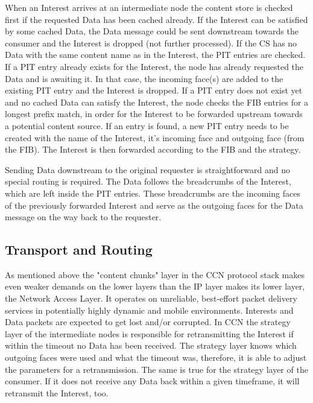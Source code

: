 When an Interest arrives at an intermediate node the content store is checked first if the requested Data has been cached already. If the Interest can be satisfied by some cached Data, the Data message could be sent downstream towards the consumer and the Interest is dropped (not further processed). If the CS has no Data with the same content name as in the Interest, the PIT entries are checked. If a PIT entry already exists for the Interest, the node has already requested the Data and is awaiting it. In that case, the incoming face(s) are added to the existing PIT entry and the Interest is dropped. If a PIT entry does not exist yet and no cached Data can satisfy the Interest, the node checks the FIB entries for a longest prefix match, in order for the Interest to be forwarded upstream towards a potential content source. If an entry is found, a new PIT entry needs to be created with the name of the Interest, it's incoming face and outgoing face (from the FIB). The Interest is then forwarded according to the FIB and the strategy.

\clearpage

Sending Data downstream to the original requester is straightforward and no special routing is required. The Data follows the breadcrumbs of the Interest, which are left inside the PIT entries. These breadcrumbs are the incoming faces of the previously forwarded Interest and serve as the outgoing faces for the Data message on the way back to the requester.

\subsection{Transport and Routing}

As mentioned above the "content chunks" layer in the CCN protocol stack makes even weaker demands on the lower layers than the IP layer makes its lower layer, the Network Access Layer. It operates on unreliable, best-effort packet delivery services in potentially highly dynamic and mobile environments. Interests and Data packets are expected to get lost and/or corrupted. In CCN the strategy layer of the intermediate nodes is responsible for retransmitting the Interest if within the timeout no Data has been received. The strategy layer knows which outgoing faces were used and what the timeout was, therefore, it is able to adjust the parameters for a retransmission. The same is true for the strategy layer of the consumer. If it does not receive any Data back within a given timeframe, it will retransmit the Interest, too.

